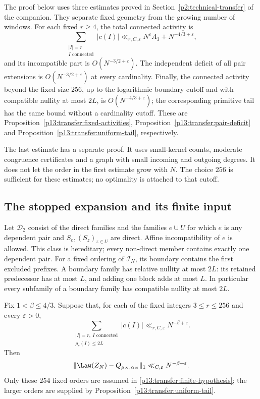 The proof below uses three estimates proved in
Section~\ref{p2:technical-transfer} of the companion. They separate
fixed geometry from the growing number of windows.
For each fixed $r\ge4$, the total connected activity is
\[
 \sum_{\substack{|I|=r\\I\text{ connected}}}|c(I)|
 \ll_{r,C,\varepsilon}N^\varepsilon A_3+N^{-4/3+\varepsilon},
\]
and its incompatible part is $O(N^{-3/2+\varepsilon})$.
The independent deficit of all pair extensions is
$O(N^{-3/2+\varepsilon})$ at every cardinality.
Finally, the connected activity beyond the fixed size $256$,
up to the logarithmic boundary cutoff and with compatible nullity
at most $2L$, is $O(N^{-4/3+\varepsilon})$; the corresponding
primitive tail has the same bound without a cardinality cutoff.
These are Proposition~\ref{p13:transfer:fixed-activities},
Proposition~\ref{p13:transfer:pair-deficit} and
Proposition~\ref{p13:transfer:uniform-tail}, respectively.

The last estimate has a separate proof. It uses small-kernel counts,
moderate congruence certificates and a graph with small incoming and
outgoing degrees. It does not let the order in the first estimate
grow with $N$. The choice $256$ is sufficient for these estimates;
no optimality is attached to that cutoff.

\subsection{The stopped expansion and its finite input}

Let $\mathscr D_2$ consist of the direct families and the families
$e\cup U$ for which $e$ is any dependent pair and $S_e,(S_z)_{z\in U}$
are direct. Affine incompatibility of $e$ is allowed. This class is
hereditary; every non-direct member contains exactly one dependent pair.
For a fixed ordering of $\mathcal I_N$, its boundary contains the first
excluded prefixes. A boundary family has relative nullity at most $2L$:
its retained predecessor has at most $L$, and adding one block adds
at most $L$. In particular every subfamily of a boundary family has
compatible nullity at most $2L$.

\begin{theorem}
\label{p13:transfer:finite}
Fix $1<\beta\leq4/3$. Suppose that, for each of the fixed integers
$3\leq r\leq256$ and every $\varepsilon>0$,
\begin{equation}
 \sum_{\substack{|I|=r,\ I\text{ connected}\\\rho_*(I)\leq2L}}
                   |c(I)|\ll_{r,C,\varepsilon}N^{-\beta+\varepsilon}.
 \label{p13:transfer:finite-hypothesis}
\end{equation}
Then
\begin{equation}
 \|\Law(Z_N)-Q_{\mu_N,\alpha_N}\|_1
                  \ll_{C,\varepsilon}N^{-\beta+\varepsilon}.
 \label{p13:transfer:finite-conclusion}
\end{equation}
Only these $254$ fixed orders are assumed in
\eqref{p13:transfer:finite-hypothesis}; the larger orders are supplied
by Proposition~\ref{p13:transfer:uniform-tail}.
\end{theorem}

